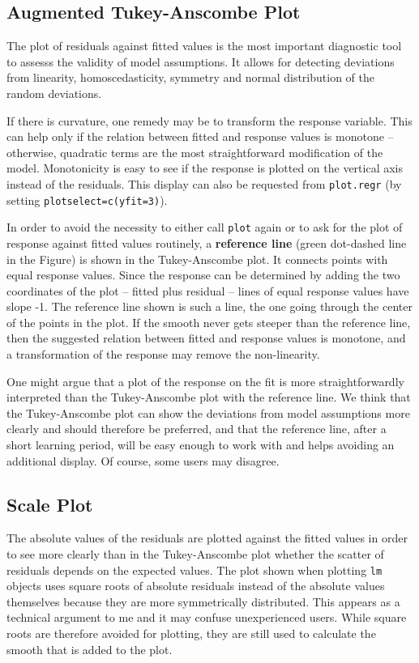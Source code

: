 \documentclass{article}
\providecommand{\T}{\texttt}
\providecommand{\ul}{\textbf}
\begin{document}
\subsection{Augmented Tukey-Anscombe Plot}
The plot of residuals against fitted values is the most important
diagnostic tool to assesss the validity of model assumptions.
It allows for detecting deviations from linearity, homoscedasticity,
symmetry and normal distribution of the random deviations.

If there is curvature, one remedy may be to transform the response
variable. This can help only if the relation between fitted and
response values is monotone -- otherwise, quadratic terms are the
most straightforward modification of the model.
Monotonicity is easy to see if the response is plotted on the vertical
axis instead of the residuals.
This display can also be requested from \T{plot.regr}
(by setting \T{plotselect=c(yfit=3)}).

In order to avoid the necessity to either call \T{plot} again or to 
ask for the plot of response against fitted values routinely,
a \ul{reference line} (green dot-dashed line in the Figure)
is shown in the Tukey-Anscombe plot.
It connects points with equal response values. Since the response can be
determined by adding the two coordinates of the plot -- 
fitted plus residual -- lines of equal response values have slope -1.
The reference line shown is such a line, the one going through the center
of the points in the plot.
If the smooth never gets steeper than the reference line, then the
suggested relation between fitted and response values is monotone, and a
transformation of the response may remove the non-linearity.

One might argue that a plot of the response on the fit is more
straightforwardly interpreted than the Tukey-Anscombe plot with the
reference line. We think that the Tukey-Anscombe plot can show the
deviations from model assumptions more clearly and should therefore be
preferred, and that the reference line, after a short learning period, will
be easy enough to work with and helps avoiding an additional display. 
Of course, some users may disagree.

\subsection{Scale Plot}
The absolute values of the residuals are plotted against the fitted values
in order to see more clearly than in the Tukey-Anscombe plot whether the 
scatter of residuals depends on the expected values.
The plot shown when plotting \T{lm} objects uses square roots of absolute
residuals instead of the absolute values themselves because they are more
symmetrically distributed. This appears as a technical argument to me and
it may confuse unexperienced users. While square roots are therefore
avoided for plotting, they are still used to calculate the smooth that is
added to the plot.
\end{document}

